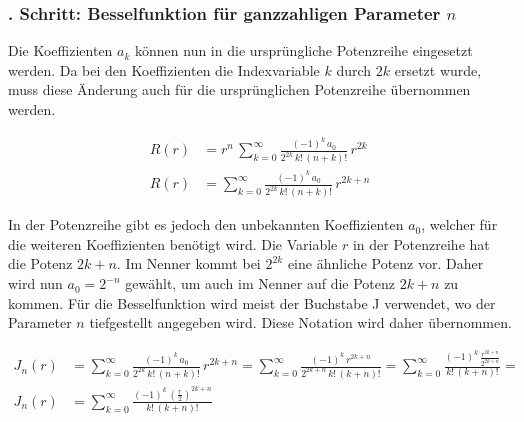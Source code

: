\subsubsection{. Schritt: Besselfunktion f\"ur ganzzahligen Parameter $n$}
\begin{normalsize}%
Die Koeffizienten $a_k$ k\"onnen nun in die urspr\"ungliche Potenzreihe  eingesetzt werden.
Da bei den Koeffizienten die Indexvariable $k$ durch $2k$ ersetzt wurde,
muss diese \"Anderung auch f\"ur die urspr\"unglichen Potenzreihe \"ubernommen werden.
\end{normalsize}
\begin{align}
	\nonumber
	R \left( r \right)
	&=
	r^{n} \,
	\sum_{k=0}^{\infty}
	\frac
	{
		\left( -1 \right) ^k \, a_0
	}{
		2^{2k} \, {k}! \, {\left( n + k \right)}!
	}
	\, r^{2k}
	\\
	R \left( r \right)
	&=
	\sum_{k=0}^{\infty}
	\frac
	{
		\left( -1 \right) ^k \, a_0
	}{
		2^{2k} \, {k}! \, {\left( n + k \right)}!
	}
	\, r^{2k + n}
	\label{eq:bessel:potenzreihe:koeffizienten:eingesetzt}
\end{align}
\begin{normalsize}%
In der Potenzreihe  gibt es jedoch den unbekannten Koeffizienten $a_0$,
welcher f\"ur die weiteren Koeffizienten ben\"otigt wird.
Die Variable $r$ in der Potenzreihe  hat die Potenz $2k + n$.
Im Nenner kommt bei $2^{2k}$ eine \"ahnliche Potenz vor.
Daher wird nun $a_0 = 2^{-n}$ gew\"ahlt,
um auch im Nenner auf die Potenz $2k + n$ zu kommen.
F\"ur die Besselfunktion wird meist der Buchstabe J verwendet,
wo der Parameter $n$ tiefgestellt angegeben wird.
Diese Notation wird daher \"ubernommen.
\end{normalsize}
\begin{align}
	\nonumber
	J_n \left( r \right)
	&=
	\sum_{k=0}^{\infty}
	\frac
	{
		\left( -1 \right) ^k \, a_0
	}{
		2^{2k} \, {k}! \, {\left( n + k \right)}!
	}
	\, r^{2k + n}
	=
	\sum_{k=0} ^{\infty}
	\frac
	{
		\left( - 1 \right) ^k \, r ^{2k+n}
	}{
		2^{2k+n} \, {k}! \, { \left( k + n \right) }!
	}
	=
	\sum_{k=0} ^{\infty}
	\frac
	{
		\left( - 1 \right) ^k \, 
		\frac
		{
			r ^{2k+n}
		}{
			2^{2k+n}
		}
	}{
		{k}! \, { \left( k + n \right) }!
	}
	=
	\\
	J_n \left( r \right)
	&=
	\sum_{k=0} ^{\infty}
	\frac
	{
		\left( - 1 \right) ^k \, 
		\left(		
		\frac
		{
			r
		}{
			2
		} \right) ^{2k+n}
	}{
		{k}! \, { \left( k + n \right) }!
	}
	\label{eq:bessel:summenformel}
\end{align}
